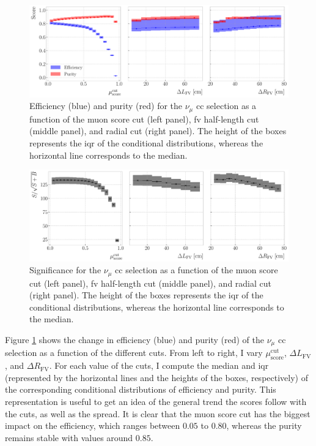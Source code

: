 \begin{figure}[t]
    \centering
    \includegraphics[width=.99\linewidth]{Images/GAr_selection/efficiency_and_purity_error_boxes.pdf}
    \caption[Efficiency and purity for the $\nu_{\mu}$ \gls{cc} selection as a function of the different cuts.]{Efficiency (blue) and purity (red) for the $\nu_{\mu}$ \gls{cc} selection as a function of the muon score cut (left panel), \gls{fv} half-length cut (middle panel), and radial cut (right panel). The height of the boxes represents the \gls{iqr} of the conditional distributions, whereas the horizontal line corresponds to the median.}
    \label{fig:numuCC_metrics_opt}
\end{figure}

\begin{figure}[t]
    \centering
    \includegraphics[width=.99\linewidth]{Images/GAr_selection/significance_error_boxes.pdf}
    \caption[Significance for the $\nu_{\mu}$ \gls{cc} selection as a function of the different cuts.]{Significance for the $\nu_{\mu}$ \gls{cc} selection as a function of the muon score cut (left panel), \gls{fv} half-length cut (middle panel), and radial cut (right panel). The height of the boxes represents the \gls{iqr} of the conditional distributions, whereas the horizontal line corresponds to the median.}
    \label{fig:numuCC_significance_opt}
\end{figure}

Figure \ref{fig:numuCC_metrics_opt} shows the change in efficiency (blue) and purity (red) of the $\nu_{\mu}$ \gls{cc} selection as a function of the different cuts. From left to right, I vary $\mu_{\mathrm{score}}^{\mathrm{cut}}$, $\Delta L_{\mathrm{FV}}$, and $\Delta R_{\mathrm{FV}}$. For each value of the cuts, I compute the median and \gls{iqr} (represented by the horizontal lines and the heights of the boxes, respectively) of the corresponding conditional distributions of efficiency and purity. This representation is useful to get an idea of the general trend the scores follow with the cuts, as well as the spread. It is clear that the muon score cut has the biggest impact on the efficiency, which ranges between $0.05$ to $0.80$, whereas the purity remains stable with values around $0.85$.

